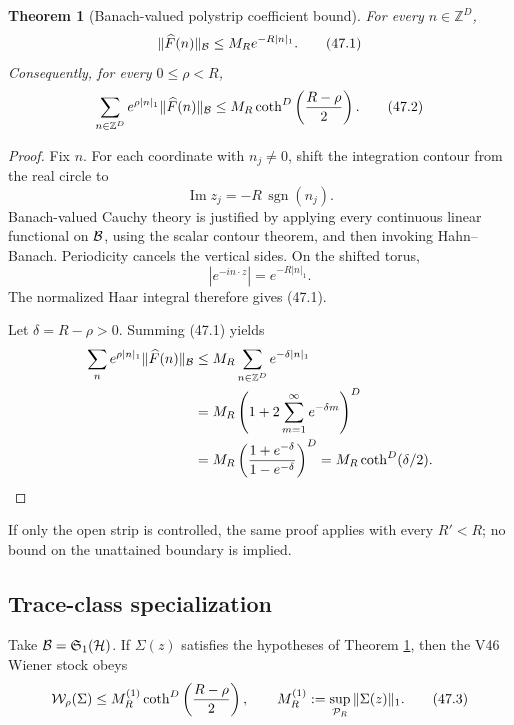 \documentclass[11pt]{article}
\newtheorem{theorem}{Theorem}[section]
\theoremstyle{remark}
\begin{document}
\begin{theorem}[Banach-valued polystrip coefficient bound]
\label{thm:v12v47-coefficients}
For every \(n\in\mathbb Z^D\),
\begin{equation}
 \|\widehat F(n)\|_{\cal B}
 \leq
 M_Re^{-R|n|_1}.                                  \tag{47.1}
\end{equation}
Consequently, for every \(0\leq\rho<R\),
\begin{equation}
 \sum_{n\in\mathbb Z^D}
 e^{\rho|n|_1}\|\widehat F(n)\|_{\cal B}
 \leq
 M_R
 \coth^D\left({R-\rho\over2}\right).              \tag{47.2}
\end{equation}
\end{theorem}

\begin{proof}
Fix \(n\).  For each coordinate with \(n_j\ne0\), shift the
integration contour from the real circle to
\[
 \operatorname{Im}z_j=-R\,\operatorname{sgn}(n_j).
\]
Banach-valued Cauchy theory is justified by applying every continuous
linear functional on \({\cal B}\), using the scalar contour theorem,
and then invoking Hahn--Banach.  Periodicity cancels the vertical
sides.  On the shifted torus,
\[
 |e^{-in\cdot z}|=e^{-R|n|_1}.
\]
The normalized Haar integral therefore gives (47.1).

Let \(\delta=R-\rho>0\).  Summing (47.1) yields
\begin{align*}
 \sum_ne^{\rho|n|_1}\|\widehat F(n)\|_{\cal B}
 &\leq
 M_R\sum_{n\in\mathbb Z^D}e^{-\delta|n|_1}\\
 &=
 M_R
 \left(
 1+2\sum_{m=1}^\infty e^{-\delta m}
 \right)^D\\
 &=
 M_R
 \left({1+e^{-\delta}\over1-e^{-\delta}}\right)^D
 =
 M_R\coth^D(\delta/2).
\end{align*}
\end{proof}

If only the open strip is controlled, the same proof applies with
every \(R'<R\); no bound on the unattained boundary is implied.

\subsection{Trace-class specialization}

Take
\({\cal B}={\mathfrak S}_1({\cal H})\).  If
\(\Sigma(z)\) satisfies the hypotheses of Theorem
\ref{thm:v12v47-coefficients}, then the V46 Wiener stock obeys
\begin{equation}
 {\cal W}_\rho(\Sigma)
 \leq
 M_R^{(1)}
 \coth^D\left({R-\rho\over2}\right),
 \qquad
 M_R^{(1)}:=\sup_{{\cal P}_R}\|\Sigma(z)\|_1.      \tag{47.3}
\end{equation}
\end{document}
